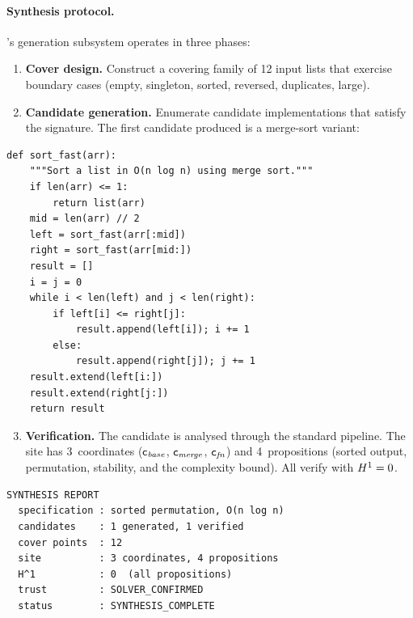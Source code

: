 \paragraph{Synthesis protocol.}
\JuGeo{}'s generation subsystem operates in three phases:

\begin{enumerate}[nosep]
  \item \textbf{Cover design.}  Construct a covering family of
    12 input lists that exercise boundary cases (empty, singleton,
    sorted, reversed, duplicates, large).

  \item \textbf{Candidate generation.}  Enumerate candidate
    implementations that satisfy the signature.  The first candidate
    produced is a merge-sort variant:
\end{enumerate}

\begin{lstlisting}[style=jugeo-python,caption={Synthesised implementation.},label={lst:synth}]
def sort_fast(arr):
    """Sort a list in O(n log n) using merge sort."""
    if len(arr) <= 1:
        return list(arr)
    mid = len(arr) // 2
    left = sort_fast(arr[:mid])
    right = sort_fast(arr[mid:])
    result = []
    i = j = 0
    while i < len(left) and j < len(right):
        if left[i] <= right[j]:
            result.append(left[i]); i += 1
        else:
            result.append(right[j]); j += 1
    result.extend(left[i:])
    result.extend(right[j:])
    return result
\end{lstlisting}

\begin{enumerate}[nosep]
  \setcounter{enumi}{2}
  \item \textbf{Verification.}  The candidate is analysed through the
    standard \JuGeo{} pipeline.  The site has 3~coordinates
    ($\mathsf{c}_{\mathit{base}}$, $\mathsf{c}_{\mathit{merge}}$,
    $\mathsf{c}_{\mathit{fn}}$) and 4~propositions (sorted output,
    permutation, stability, and the complexity bound).
    All verify with $H^{1} = 0$.
\end{enumerate}

\begin{lstlisting}[style=jugeo-output,caption={Synthesis verification trace.},label={lst:synth-trace}]
SYNTHESIS REPORT
  specification : sorted permutation, O(n log n)
  candidates    : 1 generated, 1 verified
  cover points  : 12
  site          : 3 coordinates, 4 propositions
  H^1           : 0  (all propositions)
  trust         : SOLVER_CONFIRMED
  status        : SYNTHESIS_COMPLETE
\end{lstlisting}

